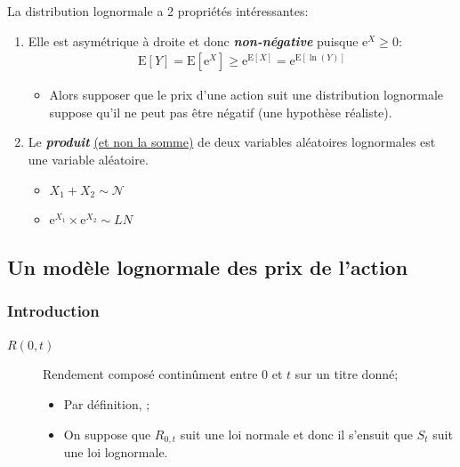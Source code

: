 \documentclass[10pt, french]{article}
\begin{document}
\begin{multicols*}{2}
La distribution lognormale a 2 propriétés intéressantes:
\begin{enumerate}[leftmargin = *]
	\item	Elle est asymétrique à droite et donc \textbf{\textit{non-négative}} puisque $\textrm{e}^{X} \ge 0$:
		\begin{align*}
		\text{E}[Y]
		=	\text{E}[\textrm{e}^{X}]
		\geq
		\textrm{e}^{\text{E}[X]}
		=	\textrm{e}^{\text{E}[\ln(Y)]}
		\end{align*}
		\begin{itemize}[leftmargin = *]
		\item	Alors supposer que le prix d'une action suit une distribution lognormale suppose qu'il ne peut pas être négatif (une hypothèse réaliste).
		\end{itemize}
	\item	Le \textit{\textbf{produit}} \underline{(et non la somme)} de deux variables aléatoires lognormales est une variable aléatoire.
		\begin{itemize}[leftmargin = *]
		\item	$X_{1} + X_{2} \sim \mathcal{N}$
		\item	$\textrm{e}^{X_{1}} 	\times \textrm{e}^{X_{2}} \sim LN$
		\end{itemize}
\end{enumerate}


\columnbreak
\subsection*{Un modèle lognormale des prix de l'action}
\subsubsection*{Introduction}
\begin{distributions}[Notation]
\begin{description}
	\item[$R(0, t)$]	Rendement composé continûment entre $0$ et $t$ sur un titre donné;
		\begin{itemize}
		\item	Par définition, ;
		\item	On suppose que $R_{0, t}$ suit une loi normale et donc il s'ensuit que $S_{t}$ suit une loi lognormale.
		\end{itemize}
\end{description}
\end{distributions}


\end{multicols*}
\end{document}
